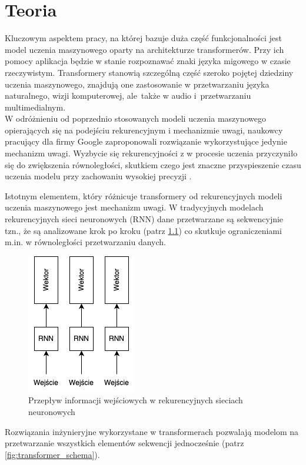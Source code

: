 \documentclass[12pt,a4paper,twoside]{book} %
\begin{document}
\chapter{Teoria}

Kluczowym aspektem pracy, na której bazuje duża część funkcjonalności jest model uczenia maszynowego oparty na architekturze transformerów. 
Przy ich pomocy aplikacja będzie w stanie rozpoznawać znaki języka migowego w czasie rzeczywistym.
Transformery stanowią szczególną część szeroko pojętej dziedziny uczenia maszynowego, znajdują one zastosowanie w przetwarzaniu języka naturalnego, wizji komputerowej, ale~także w audio i~przetwarzaniu multimedialnym. \\
W odróżnieniu od poprzednio stosowanych modeli uczenia maszynowego opierających się na podejściu rekurencyjnym i mechanizmie uwagi, naukowcy pracujący dla firmy Google zaproponowali rozwiązanie wykorzystujące jedynie mechanizm uwagi. 
Wyzbycie się rekurencyjności z w procesie uczenia przyczyniło się do zwiększenia równoległości, skutkiem czego jest znaczne przyspieszenie czasu uczenia modelu przy zachowaniu wysokiej precyzji \cite{vaswani2023attentionneed}.

Istotnym elementem, który różnicuje transformery od rekurencyjnych modeli uczenia maszynowego jest mechanizm uwagi. 
W tradycyjnych modelach rekurencyjnych sieci neuronowych (RNN) dane przetwarzane są sekwencyjnie tzn., że są analizowane krok po kroku (patrz \ref{fig:rnn_schema}) \cite{mamczur2020} co skutkuje ograniczeniami m.in. w równoległości przetwarzaniu danych.


\begin{figure}[H]
    \centering
	\includegraphics[scale=0.60]{figs/rnn.png}
	\caption{Przepływ informacji wejściowych w rekurencyjnych sieciach neuronowych}
	\label{fig:rnn_schema}
\end{figure}

Rozwiązania inżynieryjne wykorzystane w transformerach pozwalają modelom na przetwarzanie wszystkich elementów sekwencji jednocześnie (patrz \ref{fig:transformer_schema}).
\end{document}
